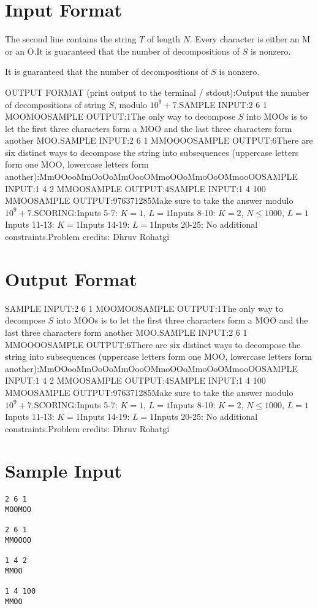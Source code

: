 \documentclass[12pt]{article}
\begin{document}
\section*{Input Format}
The second line contains the string $T$ of length $N$. Every character is either
an M or an O.It is guaranteed that the number of decompositions of $S$ is nonzero.

It is guaranteed that the number of decompositions of $S$ is nonzero.

OUTPUT FORMAT (print output to the terminal / stdout):Output the number of decompositions of string $S$, modulo $10^9+7$.SAMPLE INPUT:2 6 1
MOOMOOSAMPLE OUTPUT:1The only way to decompose $S$ into MOOs is to let the first three characters form a MOO and
the last three characters form another MOO.SAMPLE INPUT:2 6 1
MMOOOOSAMPLE OUTPUT:6There are six distinct ways to decompose the string into subsequences (uppercase
letters form one MOO, lowercase letters form another):MmOOooMmOoOoMmOooOMmoOOoMmoOoOMmooOOSAMPLE INPUT:1 4 2
MMOOSAMPLE OUTPUT:4SAMPLE INPUT:1 4 100
MMOOSAMPLE OUTPUT:976371285Make sure to take the answer modulo $10^9+7$.SCORING:Inputs 5-7: $K=1$, $L = 1$Inputs 8-10: $K=2$, $N\leq 1000$, $L = 1$Inputs 11-13: $K=1$Inputs 14-19: $L = 1$Inputs 20-25: No additional constraints.Problem credits: Dhruv Rohatgi

\section*{Output Format}
SAMPLE INPUT:2 6 1
MOOMOOSAMPLE OUTPUT:1The only way to decompose $S$ into MOOs is to let the first three characters form a MOO and
the last three characters form another MOO.SAMPLE INPUT:2 6 1
MMOOOOSAMPLE OUTPUT:6There are six distinct ways to decompose the string into subsequences (uppercase
letters form one MOO, lowercase letters form another):MmOOooMmOoOoMmOooOMmoOOoMmoOoOMmooOOSAMPLE INPUT:1 4 2
MMOOSAMPLE OUTPUT:4SAMPLE INPUT:1 4 100
MMOOSAMPLE OUTPUT:976371285Make sure to take the answer modulo $10^9+7$.SCORING:Inputs 5-7: $K=1$, $L = 1$Inputs 8-10: $K=2$, $N\leq 1000$, $L = 1$Inputs 11-13: $K=1$Inputs 14-19: $L = 1$Inputs 20-25: No additional constraints.Problem credits: Dhruv Rohatgi

\section*{Sample Input}
\begin{verbatim}
2 6 1
MOOMOO

2 6 1
MMOOOO

1 4 2
MMOO

1 4 100
MMOO
\end{verbatim}
\end{document}
